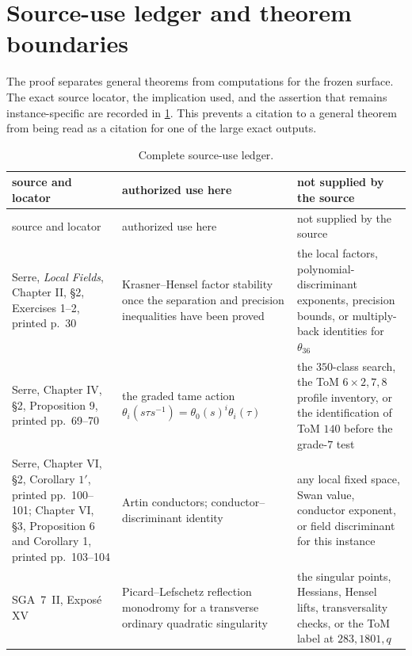 \section{Source-use ledger and theorem boundaries}
\label{app:sources}

The proof separates general theorems from computations for the frozen
surface.  The exact source locator, the implication used, and the assertion
that remains instance-specific are recorded in \cref{tab:source-ledger}.
This prevents a citation to a general theorem from being read as a citation
for one of the large exact outputs.

\begin{longtable}{@{}>{\raggedright\arraybackslash}p{}>{\raggedright\arraybackslash}p{}>{\raggedright\arraybackslash}p{}@{}}
\caption{Complete source-use ledger.}
\label{tab:source-ledger}\\
\toprule
source and locator&authorized use here&not supplied by the source\\
\midrule
\endfirsthead
\toprule
source and locator&authorized use here&not supplied by the source\\
\midrule
\endhead
Serre, \emph{Local Fields}, Chapter II, \S2, Exercises 1--2, printed
p.~30 \citep{serre1979local}&Krasner--Hensel factor stability once the
separation and precision inequalities have been proved&the local factors,
polynomial-discriminant exponents, precision bounds, or multiply-back
identities for $\theta_{36}$\\

Serre, Chapter IV, \S2, Proposition 9, printed pp.~69--70
\citep{serre1979local}&the graded tame action
$\theta_i(s\tau s^{-1})=\theta_0(s)^i\theta_i(\tau)$&the $350$-class
search, the ToM $6\times2,7,8$ profile inventory, or the identification of
ToM $140$ before the grade-$7$ test\\

Serre, Chapter VI, \S2, Corollary $1'$, printed pp.~100--101; Chapter VI,
\S3, Proposition 6 and Corollary 1, printed pp.~103--104
\citep{serre1979local}&Artin conductors; conductor--discriminant
identity&any local fixed space, Swan value, conductor exponent, or field
discriminant for this instance\\

SGA~7~II, Expos\'e XV \citep{sga7ii1973}&Picard--Lefschetz reflection
monodromy for a transverse ordinary quadratic singularity&the singular
points, Hessians, Hensel lifts, transversality checks, or the ToM label at
$283,1801,q$\\


\end{longtable}
